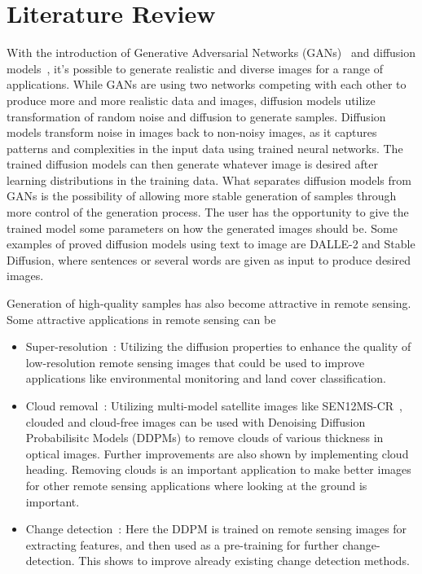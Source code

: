 \documentclass[fullpaper]{nldl}
\begin{document}
\section{Literature Review}
\label{sect:Literature}
With the introduction of Generative Adversarial Networks (GANs)~\cite{goodfellow2014generative} and diffusion models~\cite{ho2020denoising}, it's possible to generate realistic and diverse images for a range of applications. While GANs are using two networks competing with each other to produce more and more realistic data and images, diffusion models utilize transformation of random noise and diffusion to generate samples. Diffusion models transform noise in images back to non-noisy images, as it captures patterns and complexities in the input data using trained neural networks. The trained diffusion models can then generate whatever image is desired after learning distributions in the training data. What separates diffusion models from GANs is the possibility of allowing more stable generation of samples through more control of the generation process. The user has the opportunity to give the trained model some parameters on how the generated images should be. Some examples of proved diffusion models using text to image are DALLE-2 and Stable Diffusion, where sentences or several words are given as input to produce desired images.

Generation of high-quality samples has also become attractive in remote sensing. Some attractive applications in remote sensing can be
\begin{itemize}
	\item Super-resolution~\cite{sebaq2023rsdiff,han2023enhancing}: Utilizing the diffusion properties to enhance the quality of low-resolution remote sensing images that could be used to improve applications like environmental monitoring and land cover classification.
	\item Cloud removal~\cite{jing2023denoising,meraner2020cloud,zhao2023cloud}: Utilizing multi-model satellite images like SEN12MS-CR~\cite{sen12mscr}, clouded and cloud-free images can be used with Denoising Diffusion Probabilisitc Models (DDPMs) to remove clouds of various thickness in optical images. Further improvements are also shown by implementing cloud heading. Removing clouds is an important application to make better images for other remote sensing applications where looking at the ground is important.
	\item Change detection~\cite{bandara2022ddpm}: Here the DDPM is trained on remote sensing images for extracting features, and then used as a pre-training for further change-detection. This shows to improve already existing change detection methods.
\end{itemize} 
\end{document}
